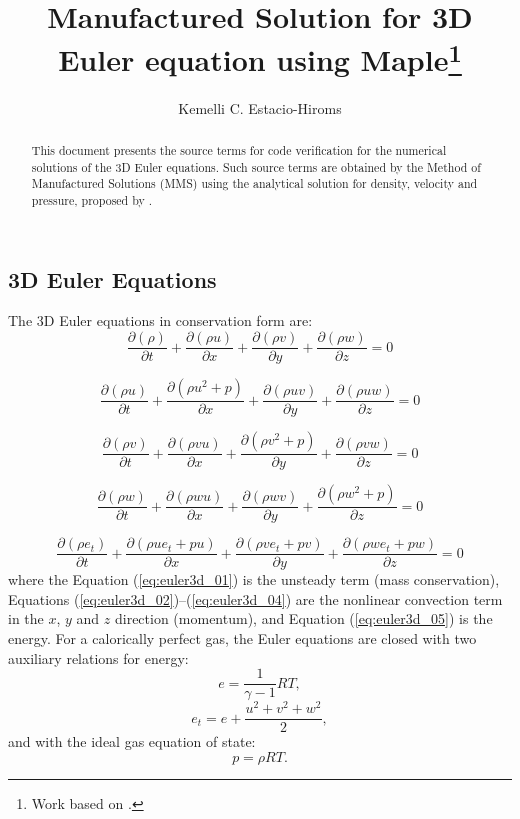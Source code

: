 \documentclass[10pt]{article}
\title{Manufactured Solution for 3D Euler equation using Maple\footnote{Work based on \citet*{Roy2002}.}}
\author{Kemelli C. Estacio-Hiroms}
\newcommand{\Diff}[2] {\dfrac{\partial( #1)}{\partial #2}}
\begin{document}
 \begin{landscape}
\maketitle

\begin{abstract}
This document presents the source terms for code verification for the numerical solutions of the 3D Euler equations. Such source terms are obtained by the Method of Manufactured Solutions (MMS) using  the analytical solution for density, velocity and pressure, proposed by \citep{Roy2002}.
\end{abstract}





\section{3D Euler Equations}


The 3D Euler equations in conservation form are:
\begin{equation}
 \label{eq:euler3d_01}
\Diff{\rho}{t} + \Diff{\rho u}{x}+\Diff{\rho v}{y} + \Diff{\rho w}{z} = 0
\end{equation}


\begin{equation}
 \label{eq:euler3d_02}
\Diff{\rho u}{t} + \Diff{\rho u^2 + p}{x}+\Diff{\rho uv}{y} +\Diff{\rho u w}{z} = 0
\end{equation}


\begin{equation}
 \label{eq:euler3d_03}
\Diff{\rho v}{t} + \Diff{\rho vu}{x}+\Diff{\rho v^2+p}{y} + \Diff{\rho v w}{z}= 0
\end{equation}


\begin{equation}
 \label{eq:euler3d_04}
\Diff{\rho w}{t} + \Diff{\rho wu}{x} + \Diff{\rho wv}{y} + \Diff{\rho w^2+p}{z}  = 0
\end{equation}


\begin{equation}
 \label{eq:euler3d_05}
\Diff{\rho e_t}{t} + \Diff{\rho ue_t +pu}{x}+\Diff{\rho ve_t +pv}{y}+\Diff{\rho w e_t +pw}{z} = 0
\end{equation}
%
where the Equation (\ref{eq:euler3d_01}) is the unsteady term (mass conservation), Equations (\ref{eq:euler3d_02})--(\ref{eq:euler3d_04}) are the nonlinear convection term in the $x$, $y$ and $z$ direction (momentum), and Equation (\ref{eq:euler3d_05}) is the energy. For a calorically perfect gas, the Euler equations are closed with two auxiliary relations for energy:
\begin{equation}
 \label{eq:euler3d_06}
e=\dfrac{1}{\gamma -1}RT ,
\end{equation}
%
\begin{equation}
 \label{eq:euler3d_07}
e_t= e+\dfrac{u^2+v^2+w^2}{2},
\end{equation}
and with the ideal gas equation of state:
\begin{equation}
 \label{eq:euler3d_08}
p=\rho RT.
\end{equation}


\end{landscape}
\end{document}
